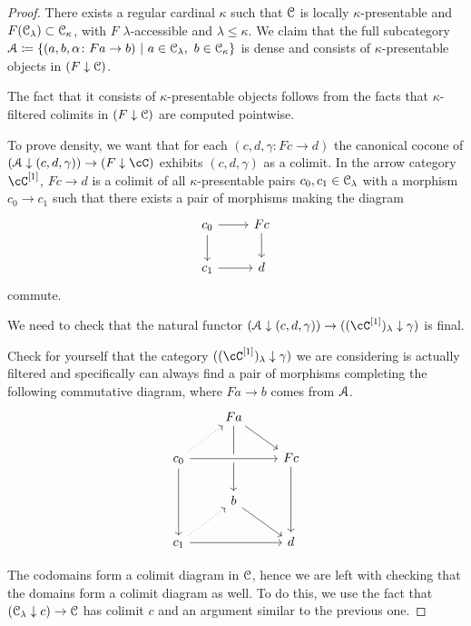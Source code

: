 \documentclass[a4paper,11pt,oneside,openany]{scrbook}
\begin{document}
\begin{proof}
	There exists a regular cardinal $\kappa$ such that $\operatorname{\mathcal{C}}$ is locally
    $\kappa$-presentable and $F(\operatorname{\mathcal{C}}_\lambda)\subset\operatorname{\mathcal{C}}_\kappa$, with $F$
    $\lambda$-accessible and $\lambda\leq\kappa$. We claim that the full
    subcategory $\operatorname{\mathcal{A}}\coloneqq\{(a,b,\alpha\colon Fa\rightarrow b)\ |\
    a\in\operatorname{\mathcal{C}}_\lambda,\ b\in\operatorname{\mathcal{C}}_\kappa\}$ is dense and consists of
    $\kappa$-presentable objects in $(F\downarrow\operatorname{\mathcal{C}})$.

	The fact that it consists of $\kappa$-presentable objects follows from the
    facts that $\kappa$-filtered colimits in $(F\downarrow\operatorname{\mathcal{C}})$ are computed
    pointwise.

	To prove density, we want that for each $(c,d,\gamma\colon Fc\rightarrow d)$
    the canonical cocone of $(\A\downarrow (c,d,\gamma))\rightarrow
    (F\downarrow\cC)$ exhibits $(c,d,\gamma)$
    as a colimit. In the arrow category $\cC^{[1]}$, $Fc\rightarrow d$ is a
    colimit of all $\kappa$-presentable pairs $c_0,c_1\in\operatorname{\mathcal{C}}_\lambda$ with a
    morphism $c_0\rightarrow c_1$ such that there exists a pair of morphisms
    making the diagram
	\[
		\begin{tikzcd}
			c_0\ar[d]\ar[r]
			& Fc\ar[d] \\
			c_1\ar[r]
			& d
		\end{tikzcd}
	\]
    commute.

	We need to check that the natural functor $(\A\downarrow
    (c,d,\gamma))\rightarrow ((\cC^{[1]})_\lambda\downarrow\gamma)$ is final.

	Check for yourself that the category $((\cC^{[1]})_\lambda\downarrow\gamma)$
    we are considering is actually filtered and specifically can always find a
    pair of morphisms completing the following commutative diagram, where
    $Fa\rightarrow b$ comes from $\operatorname{\mathcal{A}}$.
	\[
		\begin{tikzcd}
			& Fa\ar[dr]\ar[dd] \\
			c_0\ar[ur, dotted]\ar[rr, crossing over]\ar[dd]
			&& Fc\ar[dd] \\
			& b\ar[dr] \\
			c_1\ar[ur, dotted]\ar[rr]
			&& d
		\end{tikzcd}
	\]

	The codomains form a colimit diagram in $\operatorname{\mathcal{C}}$, hence we are left with
    checking that the domains form a colimit diagram as well. To do this, we use
    the fact that $(\operatorname{\mathcal{C}}_\lambda\downarrow c)\rightarrow\operatorname{\mathcal{C}}$ has colimit $c$ and an
    argument similar to the previous one.
\end{proof}
\end{document}
